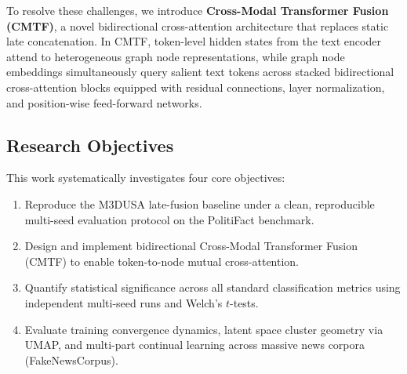 \documentclass[conference]{IEEEtran}
\begin{document}
To resolve these challenges, we introduce \textbf{Cross-Modal Transformer Fusion (CMTF)}, a novel bidirectional cross-attention architecture that replaces static late concatenation. In CMTF, token-level hidden states from the text encoder attend to heterogeneous graph node representations, while graph node embeddings simultaneously query salient text tokens across stacked bidirectional cross-attention blocks equipped with residual connections, layer normalization, and position-wise feed-forward networks.

\subsection{Research Objectives}
This work systematically investigates four core objectives:
\begin{enumerate}
    \item Reproduce the M3DUSA late-fusion baseline under a clean, reproducible multi-seed evaluation protocol on the PolitiFact benchmark.
    \item Design and implement bidirectional Cross-Modal Transformer Fusion (CMTF) to enable token-to-node mutual cross-attention.
    \item Quantify statistical significance across all standard classification metrics using independent multi-seed runs and Welch's $t$-tests.
    \item Evaluate training convergence dynamics, latent space cluster geometry via UMAP, and multi-part continual learning across massive news corpora (FakeNewsCorpus).
\end{enumerate}
\end{document}
